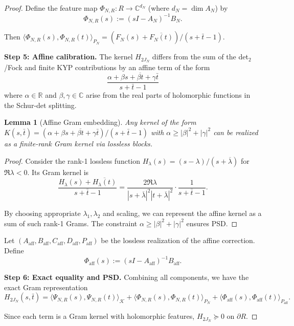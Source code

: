 \documentclass[11pt]{article}
\newtheorem{lemma}[theorem]{Lemma}
\theoremstyle{remark}
\begin{document}
\begin{proof}
Define the feature map $\Phi_{N,R}: R \to \mathbb{C}^{d_N}$ (where $d_N = \dim A_N$) by
\[
  \Phi_{N,R}(s) := (sI - A_N)^{-1}B_N.
\]

Then $\langle \Phi_{N,R}(s), \Phi_{N,R}(t) \rangle_{P_N} = (F_N(s) + \overline{F_N(t)})/(s + \bar t - 1)$.

\medskip
\noindent\textbf{Step 5: Affine calibration.}
The kernel $H_{2J_N}$ differs from the sum of the det$_2$/Fock and finite KYP contributions by an affine term of the form
\[
  \frac{\alpha + \beta s + \overline{\beta t} + \gamma \bar t}{s + \bar t - 1}
\]
where $\alpha \in \mathbb{R}$ and $\beta, \gamma \in \mathbb{C}$ arise from the real parts of holomorphic functions in the Schur-det splitting.

\begin{lemma}[Affine Gram embedding]\label{lem:affine-gram-embedding}
Any kernel of the form $K(s,\bar t) = (\alpha + \beta s + \overline{\beta t} + \gamma \bar t)/(s + \bar t - 1)$ with $\alpha \geq |\beta|^2 + |\gamma|^2$ can be realized as a finite-rank Gram kernel via lossless blocks.
\end{lemma}

\begin{proof}
Consider the rank-1 lossless function $H_\lambda(s) = (s - \lambda)/(s + \overline{\lambda})$ for $\Re \lambda < 0$. Its Gram kernel is
\[
  \frac{H_\lambda(s) + \overline{H_\lambda(t)}}{s + \bar t - 1} = \frac{2\Re \lambda}{|s + \overline{\lambda}|^2 |t + \overline{\lambda}|^2} \cdot \frac{1}{s + \bar t - 1}.
\]

By choosing appropriate $\lambda_1, \lambda_2$ and scaling, we can represent the affine kernel as a sum of such rank-1 Grams. The constraint $\alpha \geq |\beta|^2 + |\gamma|^2$ ensures PSD.
\end{proof}

Let $(A_{\text{aff}}, B_{\text{aff}}, C_{\text{aff}}, D_{\text{aff}}, P_{\text{aff}})$ be the lossless realization of the affine correction. Define
\[
  \Phi_{\text{aff}}(s) := (sI - A_{\text{aff}})^{-1}B_{\text{aff}}.
\]

\medskip
\noindent\textbf{Step 6: Exact equality and PSD.}
Combining all components, we have the exact Gram representation
\[
  H_{2J_N}(s,\bar t) = \langle \Psi_{N,R}(s), \Psi_{N,R}(t) \rangle_{\mathcal{K}} + \langle \Phi_{N,R}(s), \Phi_{N,R}(t) \rangle_{P_N} + \langle \Phi_{\text{aff}}(s), \Phi_{\text{aff}}(t) \rangle_{P_{\text{aff}}}.
\]

Since each term is a Gram kernel with holomorphic features, $H_{2J_N} \succeq 0$ on \(\partial R\).


\end{proof}
\end{document}
